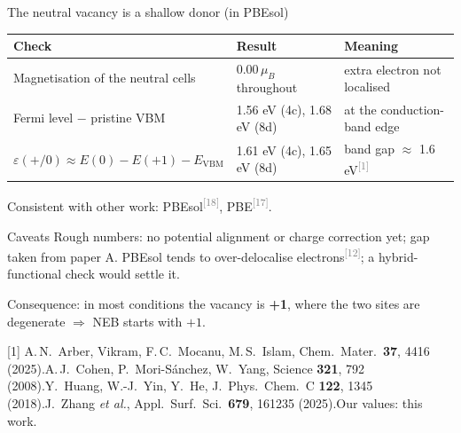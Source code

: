 \documentclass[aspectratio=169,10pt]{beamer}
\newcommand{\cit}[1]{\textsuperscript{\textcolor{gray}{[#1]}}}
\newcommand{\refs}[1]{\par\vfill\begingroup\tiny\color{gray}\raggedright #1\par\endgroup}
\newcommand{\RA}{[1] A.\,N.~Arber, Vikram, F.\,C.~Mocanu, M.\,S.~Islam, Chem.\ Mater.\ \textbf{37}, 4416 (2025).}
\newcommand{\RN}{[12] A.\,J.~Cohen, P.~Mori-S\'anchez, W.~Yang, Science \textbf{321}, 792 (2008).}
\newcommand{\RT}{[18] J.~Zhang \emph{et al.}, Appl.\ Surf.\ Sci.\ \textbf{679}, 161235 (2025).}
\newcommand{\RS}{[17] Y.~Huang, W.-J.~Yin, Y.~He, J.\ Phys.\ Chem.\ C \textbf{122}, 1345 (2018).}
\begin{document}
\begin{frame}{The neutral vacancy is a shallow donor (in PBEsol)}
  \small
  \begin{tabular}{lll}
    \toprule
    Check & Result & Meaning \\
    \midrule
    Magnetisation of the neutral cells & 0.00\,$\mu_B$ throughout & extra electron not localised \\
    Fermi level $-$ pristine VBM & 1.56 eV (4c), 1.68 eV (8d) & at the conduction-band edge \\
    $\varepsilon(+/0) \approx E(0) - E(+1) - E_\mathrm{VBM}$ & 1.61 eV (4c), 1.65 eV (8d) & band gap $\approx$ 1.6 eV\cit{1} \\
    \bottomrule
  \end{tabular}

  \vspace{0.4em}
  Consistent with other work: PBEsol\cit{18}, PBE\cit{17}.

  \vspace{0.4em}
  \begin{alertblock}{Caveats}
    Rough numbers: no potential alignment or charge correction yet; gap taken from paper A. PBEsol tends to over-delocalise electrons\cit{12}; a hybrid-functional check would settle it.
  \end{alertblock}

  \footnotesize Consequence: in most conditions the vacancy is \textbf{+1}, where the two sites are degenerate $\Rightarrow$ NEB starts with $+1$.
  \refs{\RA\quad \RN\quad \RS\quad \RT\quad Our values: this work.}
\end{frame}
\end{document}
